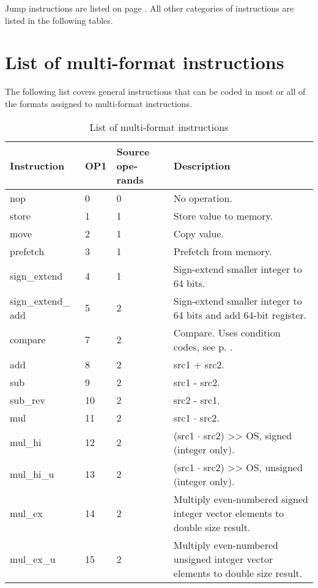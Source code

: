 \documentclass[forwardcom.tex]{subfiles}
\begin{document}
Jump instructions are listed on page \pageref{table:controlTransferInstructions}. All other categories of instructions are listed in the following tables.


\section{List of multi-format instructions}
The following list covers general instructions that can be coded in most or all of the formats
assigned to multi-format instructions.

\begin{longtable} {|p{18mm}|p{9mm}|p{9mm}|p{76mm}|}
\caption{
List of multi-format instructions} 
\label{table:ListOfMultiFormatInstructions} \\
\endfirsthead
\endhead
\hline
\bfseries Instruction & \bfseries OP1 & \bfseries Source ope-rands & \bfseries Description \\
\hline
nop          &  0 & 0 & No operation. \\
store        &  1 & 1 & Store value to memory. \\
move         &  2 & 1 & Copy value. \\
prefetch     &  3 & 1 & Prefetch from memory. \\
sign\_extend &  4 & 1 & Sign-extend smaller integer to 64 bits. \\
sign\_extend\_ add & 5 & 2 & Sign-extend smaller integer to 64 bits and add 64-bit register. \\
compare      &  7 & 2 & Compare. Uses condition codes, see p. \pageref{table:conditionCodesForCompareInstruction}. \\
add          &  8 & 2 & src1 + src2. \\
sub          &  9 & 2 & src1 - src2. \\
sub\_rev     & 10 & 2 & src2 - src1. \\
mul          & 11 & 2 & src1 $\cdot$ src2. \\ 
mul\_hi      & 12 & 2 & (src1 $\cdot$ src2) \textgreater\textgreater{} OS, signed (integer only). \\
mul\_hi\_u   & 13 & 2 & (src1 $\cdot$ src2) \textgreater\textgreater{}  OS, unsigned (integer only). \\
mul\_ex      & 14 & 2 & Multiply even-numbered signed integer vector elements to double size result. \\
mul\_ex\_u   & 15 & 2 & Multiply even-numbered unsigned integer vector elements to double size result. \\

\end{longtable}
\end{document}
